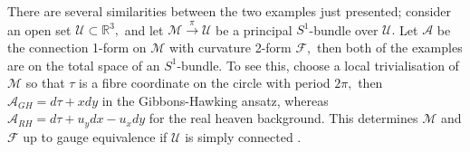 \documentclass[a4paper,12pt, onecolumn, notitlepage]{article}
\theoremstyle{definition}
\theoremstyle{remark}
\begin{document}
There are several similarities between the two examples just presented; consider an open set $\mathcal{U}\subset\mathbb{R}^{3},$ and let $\mathcal{M}\overset{\pi}{\rightarrow}\mathcal{U}$ be a principal $S^{1}$-bundle over $\mathcal{U}.$ Let $\mathcal{A}$ be the connection 1-form on $\mathcal{M}$ with curvature 2-form $\mathcal{F},$ then both of the examples are on the total space of an $S^{1}$-bundle. To see this, choose a local trivialisation of $\mathcal{M}$ so that $\tau$ is a fibre coordinate on the circle with period $2\pi,$ then $\mathcal{A}_{GH}=d\tau + xdy$ in the Gibbons-Hawking ansatz, whereas $\mathcal{A}_{RH}=d\tau + u_{y}dx - u_{x}dy$ for the real heaven background. This determines $\mathcal{M}$ and $\mathcal{F}$ up to gauge equivalence if $\mathcal{U}$ is simply connected \cite{lebrun_1991}.

\end{document}

